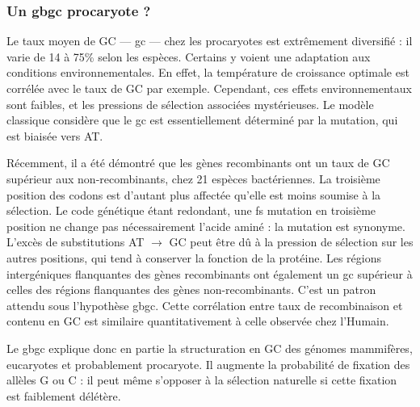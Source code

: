 \documentclass[11pt, oneside]{scrartcl}
\begin{document}
\subsubsection{Un \ac{gbgc} procaryote ?}
\label{sec:orgheadline13}
Le taux moyen de GC --- \ac{gc} --- chez les procaryotes est extrêmement
diversifié : il varie de 14 à 75\% selon les espèces. Certains y voient une
adaptation aux conditions environnementales. En effet, la température de
croissance optimale est corrélée avec le taux de GC par exemple. Cependant, ces
effets environnementaux sont faibles, et les pressions de sélection associées
mystérieuses. Le modèle classique considère que le \ac{gc} est essentiellement
déterminé par la mutation, qui est biaisée vers
AT\cite{hershberg_evidence_2010,sueoka_directional_1988}.

Récemment, il a été démontré que les gènes recombinants ont un taux de GC
supérieur aux non-recombinants\cite{lassalle_gc-content_2015}, chez 21 espèces
bactériennes. La troisième position des codons est d'autant plus affectée
qu'elle est moins soumise à la sélection. Le code génétique étant redondant, une fs
mutation en troisième position ne change pas nécessairement l'acide aminé : la
mutation est synonyme. L'excès de substitutions AT \(\rightarrow\) GC peut être dû
à la pression de sélection sur les autres positions, qui tend à conserver la
fonction de la protéine. Les régions intergéniques flanquantes des gènes
recombinants ont également un \ac{gc} supérieur à celles des régions flanquantes
des gènes non-recombinants. C'est un patron attendu sous l'hypothèse \ac{gbgc}.
Cette corrélation entre taux de recombinaison et contenu en GC est similaire
quantitativement à celle observée chez l'Humain\cite{lassalle_gc-content_2015}.

\begin{transition}
  Le \ac{gbgc} explique donc en partie la structuration en GC des génomes
  mammifères, eucaryotes et probablement procaryote. Il augmente la probabilité
  de fixation des allèles G ou C : il peut même s'opposer à la sélection
  naturelle si cette fixation est faiblement délétère.  
\end{transition}

\end{document}
